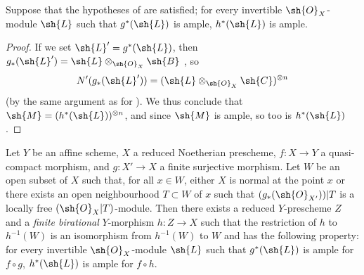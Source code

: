 \begin{corollary}[6.6.10]
\label{II.6.6.10}
Suppose that the hypotheses of  are satisfied;
for every invertible $\sh{O}_X$-module $\sh{L}$ such that $g^*(\sh{L})$ is ample, $h^*(\sh{L})$ is ample.
\end{corollary}

\begin{proof}
If we set $\sh{L}'=g^*(\sh{L})$, then $g_*(\sh{L}')=\sh{L}\otimes_{\sh{O}_X}\sh{B}$ , so
\[
  N'(g_*(\sh{L}')) = (\sh{L}\otimes_{\sh{O}_X}\sh{C})^{\otimes n}
\]
(by the same argument as for ).
We thus conclude that $\sh{M}=(h^*(\sh{L}))^{\otimes n}$, and since $\sh{M}$ is ample, so too is $h^*(\sh{L})$ .
\end{proof}

\begin{proposition}[6.6.11]
\label{II.6.6.11}
Let $Y$ be an affine scheme, $X$ a reduced Noetherian prescheme, $f:X\to Y$ a quasi-compact morphism, and $g:X'\to X$ a finite surjective morphism.
Let $W$ be an open subset of $X$ such that, for all $x\in W$, either $X$ is normal at the point $x$ or there exists an open neighbourhood $T\subset W$ of $x$ such that $(g_*(\sh{O}_{X'}))|T$ is a locally free $(\sh{O}_X|T)$-module.
Then there exists a reduced $Y$-prescheme $Z$ and a \emph{finite birational} $Y$-morphism $h:Z\to X$ such that the restriction of $h$ to $h^{-1}(W)$ is an isomorphism from $h^{-1}(W)$ to $W$ and has the following property: for every invertible $\sh{O}_X$-module $\sh{L}$ such that $g^*(\sh{L})$ is ample for $f\circ g$, $h^*(\sh{L})$ is ample for $f\circ h$.
\end{proposition}

